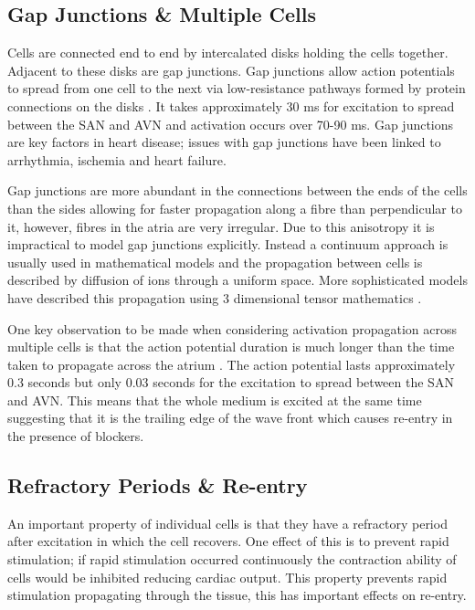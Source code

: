 \subsection{Gap Junctions \& Multiple Cells} \label{gapjunctions}
Cells are connected end to end by intercalated disks holding the cells together. Adjacent to these disks are gap junctions. Gap junctions allow action potentials to spread from one cell to the next via low-resistance pathways formed by protein connections on the disks \citep{gapjunctions}. It takes approximately 30 ms for excitation to spread between the SAN and AVN and activation occurs over 70-90 ms. Gap junctions are key factors in heart disease; issues with gap junctions have been linked to arrhythmia, ischemia and heart failure.\par

Gap junctions are more abundant in the connections between the ends of the cells than the sides allowing for faster propagation along a fibre than perpendicular to it, however, fibres in the atria are very irregular. Due to this anisotropy it is impractical to model gap junctions explicitly. Instead a continuum approach is usually used in mathematical models and the propagation between cells is described by diffusion of ions through a uniform space. More sophisticated models have described this propagation using 3 dimensional tensor mathematics \citep{unansweredquestions}. \par

One key observation to be made when considering activation propagation across multiple cells is that the action potential duration is much longer than the time taken to propagate across the atrium \citep{ecg}. The action potential lasts approximately 0.3 seconds but only 0.03 seconds for the excitation to spread between the SAN and AVN. This means that the whole medium is excited at the same time suggesting that it is the trailing edge of the wave front which causes re-entry in the presence of blockers.

\subsection{Refractory Periods \& Re-entry}
\label{section2.4}
An important property of individual cells is that they have a refractory period after excitation in which the cell recovers. One effect of this is to prevent rapid stimulation; if rapid stimulation occurred continuously the contraction ability of cells would be inhibited reducing cardiac output. This property prevents rapid stimulation propagating through the tissue, this has important effects on re-entry. \par

